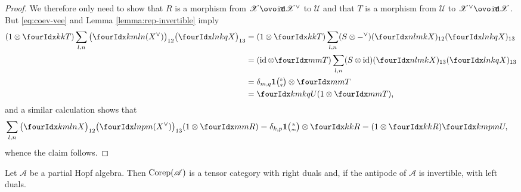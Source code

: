 \begin{proof}
We therefore only need to show that $R$ is a morphism from
$\mathscr{X}\Circt\dual{\mathscr{X}}$ to $\mathscr{U}$ and that $T$ is
a morphism from $\mathscr{U}$ to
$\dual{\mathscr{X}}\Circt{\mathscr{X}}$.  But \eqref{eq:coev-vee} and
Lemma \ref{lemma:rep-invertible} imply
  \begin{align*}
    (1\otimes \Gru{T}{k}{k})
 \sum_{l,n}  \big(
\Gr{(\dual{X})}{k}{l}{m}{n}\big)_{12}
\big(\Gr{X}{l}{k}{n}{q}\big)_{13} &=
    (1\otimes \Gru{T}{k}{k})
 \sum_{l,n} 
(S \otimes \dual{-})(\Gr{X}{n}{m}{l}{k})_{12}
    (\Gr{X}{l}{k}{n}{q})_{13} \\ &=
(\id\otimes \Gru{T}{m}{m})  \sum_{l,n}
      (S \otimes \id)(\Gr{X}{n}{m}{l}{k})_{13}(\Gr{X}{l}{k}{n}{q})_{13} \\
    &= \delta_{m,q}\UnitC{k}{q}\otimes \Gru{T}{m}{m} \\
    &= \Gr{U}{k}{k}{m}{q}(1 \otimes \Gru{T}{m}{m}),
  \end{align*}
and a similar  calculation shows that 
\begin{align*}
 \sum_{l,n}  \big(
\Gr{X}{k}{l}{m}{n}\big)_{12}
\big(\Gr{(\dual{X})}{l}{p}{n}{m}\big)_{13} 
    (1\otimes \Gru{R}{m}{m})
&= \delta_{k,p} \UnitC{k}{m} \otimes \Gru{R}{k}{k} = (1 \otimes
\Gru{R}{k}{k}) \Gr{U}{k}{p}{m}{m},
\end{align*}
whence the claim follows.
\end{proof}
\begin{Cor} \label{cor:rep-tensor-duality}
  Let $\mathscr{A}$ be a partial Hopf algebra. Then
  $\mathrm{Corep}(\mathscr{A})$ is a tensor category with right
  duals and, if the antipode of $\mathscr{A}$ is invertible, with left duals.
\end{Cor}

